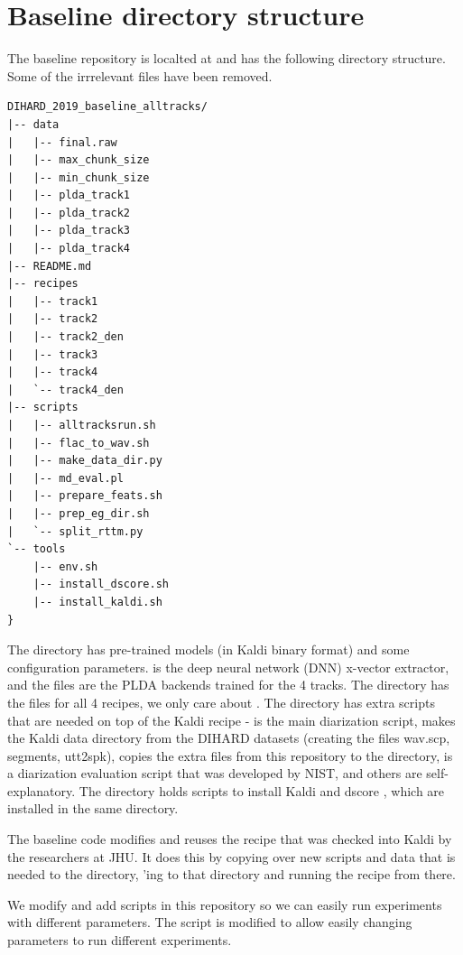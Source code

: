 \section{Baseline directory structure}
The baseline repository is localted at  and has the following directory structure. Some of the irrrelevant files have been removed.

\begin{verbatim}
DIHARD_2019_baseline_alltracks/
|-- data
|   |-- final.raw
|   |-- max_chunk_size
|   |-- min_chunk_size
|   |-- plda_track1
|   |-- plda_track2
|   |-- plda_track3
|   |-- plda_track4
|-- README.md
|-- recipes
|   |-- track1
|   |-- track2
|   |-- track2_den
|   |-- track3
|   |-- track4
|   `-- track4_den
|-- scripts
|   |-- alltracksrun.sh
|   |-- flac_to_wav.sh
|   |-- make_data_dir.py
|   |-- md_eval.pl
|   |-- prepare_feats.sh
|   |-- prep_eg_dir.sh
|   `-- split_rttm.py
`-- tools
    |-- env.sh
    |-- install_dscore.sh
    |-- install_kaldi.sh
}
\end{verbatim}

The  directory has pre-trained models (in Kaldi binary format) and some configuration parameters.  is the deep neural network (DNN) x-vector extractor, and the  files are the PLDA backends trained for the 4 tracks. The  directory has the  files for all 4 recipes, we only care about . The  directory has extra scripts that are needed on top of the  Kaldi recipe -  is the main diarization script,  makes the Kaldi data directory from the DIHARD datasets (creating the files wav.scp, segments, utt2spk),  copies the extra files from this repository to the  directory,  \cite{mdeval2006} is a diarization evaluation script that was developed by NIST, and others are self-explanatory. The  directory holds scripts to install Kaldi and dscore \cite{dscore}, which are installed in the same directory.

The baseline code modifies and reuses the  recipe that was checked into Kaldi by the researchers at JHU. It does this by copying over new scripts and data that is needed to the  directory, 'ing to that directory and running the recipe from there.

We modify and add scripts in this repository so we can easily run experiments with different parameters. The  script is modified to allow easily changing parameters to run different experiments.

